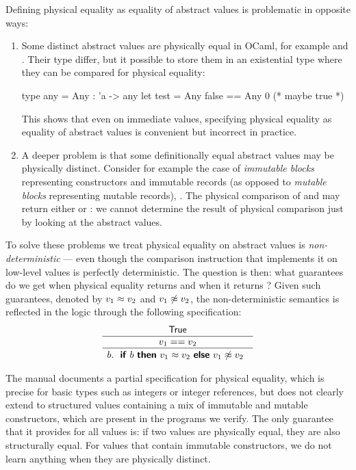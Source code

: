 Defining physical equality as \Rocq equality of abstract values is problematic in opposite ways:
\begin{enumerate}
\item Some distinct abstract values are physically equal in OCaml, for example  and . Their type differ, but it possible to store them in an existential type where they can be compared for physical equality:
\begin{ocamlcode}
type any = Any : 'a -> any
let test = Any false == Any 0 (* maybe true *)
\end{ocamlcode}
This shows that even on immediate values, specifying physical equality as equality of abstract values is convenient but incorrect in practice.

\item A deeper problem is that some definitionally equal abstract values may be physically distinct.
  Consider for example the case of \emph{immutable blocks} representing constructors and immutable records (as opposed to \emph{mutable blocks} representing mutable records), \eg {}.
  The physical comparison of  and  may return either  or : we cannot determine the result of physical comparison just by looking at the abstract values.
\end{enumerate}

To solve these problems we treat physical equality on abstract values is \emph{non-deterministic} --- even though the comparison instruction that implements it on low-level values is perfectly deterministic.
The question is then: what guarantees do we get when physical equality returns  and when it returns ?
Given such guarantees, denoted by $v_1 \similar v_2$ and $v_1 \nonsimilar v_2$, the non-deterministic semantics is reflected in the logic through the following specification:
\[
  \iSpec{
    \iTrue
  }{
    v_1 == v_2
  }{
    b
  }{
    \myifOneline{
      b
    }{
      v_1 \similar v_2
    }{
      v_1 \nonsimilar v_2
    }
  }
\]

The \OCaml manual documents a partial specification for physical equality, which is precise for basic types such as integers or integer references, but does not clearly extend to structured values containing a mix of immutable and mutable constructors, which are present in the programs we verify.
The only guarantee that it provides for all values is: if two values are physically equal, they are also structurally equal. For values that contain immutable constructors, we do not learn anything when they are physically distinct.

